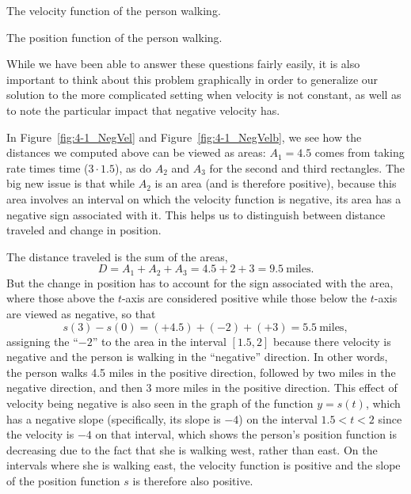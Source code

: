 \begin{marginfigure}[0cm] %
\caption{The velocity function of the person walking.} \label{fig:4-1_NegVel}
\end{marginfigure}

\begin{marginfigure}[0cm] %
\caption{The position function of the person walking.} \label{fig:4-1_NegVelb}
\end{marginfigure}

While we have been able to answer these questions fairly easily, it is also important to think about this problem graphically in order to generalize our solution to the more complicated setting when velocity is not constant, as well as to note the particular impact that negative velocity has.

In Figure~\ref{fig:4-1_NegVel} and Figure~\ref{fig:4-1_NegVelb}, we see how the distances we computed above can be viewed as areas:  $A_1 = 4.5$ comes from taking rate times time ($3 \cdot 1.5$), as do $A_2$ and $A_3$ for the second and third rectangles.  The big new issue is that while $A_2$ is an area (and is therefore positive), because this area involves an interval on which the velocity function is negative, its area has a negative sign associated with it.  This helps us to distinguish between distance traveled and change in position.

The distance traveled is the sum of the areas,
\[D = A_1 + A_2 + A_3 = 4.5 + 2 + 3 = 9.5 \ \mbox{miles}.\]
But the change in position has to account for the sign associated with the area, where those above the $t$-axis are considered positive while those below the $t$-axis are viewed as negative, so that 
\[s(3) - s(0) = (+4.5) + (-2) + (+3) = 5.5 \ \mbox{miles},\]
assigning the ``$-2$'' to the area in the interval $[1.5,2]$ because there velocity is negative and the person is walking in the ``negative'' direction.  In other words, the person walks 4.5 miles in the positive direction, followed by two miles in the negative direction, and then 3 more miles in the positive direction.  This effect of velocity being negative is also seen in the graph of the function $y=s(t)$, which has a negative slope (specifically, its slope is $-4$) on the interval $1.5<t<2$ since the velocity is $-4$ on that interval, which shows the person's position function is decreasing due to the fact that she is walking west, rather than east.  On the intervals where she is walking east, the velocity function is positive and the slope of the position function $s$ is therefore also positive.

